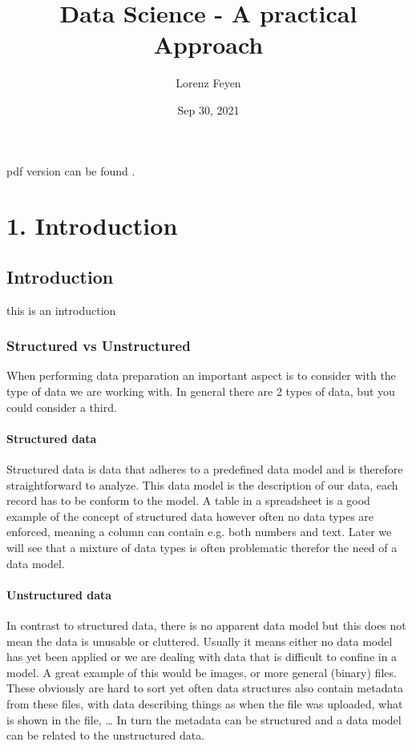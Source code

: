 \documentclass[letterpaper,10pt,english]{jupyterBook}
\title{Data Science - A practical Approach}
\date{Sep 30, 2021}
\author{Lorenz Feyen}
\begin{document}
\pagestyle{empty}
\sphinxmaketitle
\pagestyle{plain}
\sphinxtableofcontents
\pagestyle{normal}
\label{\detokenize{foreword::doc}}


\sphinxAtStartPar
pdf version can be found .


\part{1. Introduction}


\chapter{Introduction}
\label{\detokenize{c1_introduction/introduction:introduction}}\label{\detokenize{c1_introduction/introduction::doc}}
\sphinxAtStartPar
this is an introduction


\section{Structured vs Unstructured}
\label{\detokenize{c1_introduction/introduction:structured-vs-unstructured}}
\sphinxAtStartPar
When performing data preparation an important aspect is to consider with the type of data we are working with.
In general there are 2 types of data, but you could consider a third.


\subsection{Structured data}
\label{\detokenize{c1_introduction/introduction:structured-data}}
\sphinxAtStartPar
Structured data is data that adheres to a pre\sphinxhyphen{}defined data model and is therefore straightforward to analyze.
This data model is the description of our data, each record has to be conform to the model.
A table in a spreadsheet is a good example of the concept of structured data however often no data types are enforced, meaning a column can contain e.g. both numbers and text.
Later we will see that a mixture of data types is often problematic therefor the need of a data model.


\subsection{Unstructured data}
\label{\detokenize{c1_introduction/introduction:unstructured-data}}
\sphinxAtStartPar
In contrast to structured data, there is no apparent data model but this does not mean the data is unusable or cluttered.
Usually it means either no data model has yet been applied or we are dealing with data that is difficult to confine in a model.
A great example of this would be images, or more general (binary) files.
These obviously are hard to sort yet often data structures also contain metadata from these files, with data describing things as when the file was uploaded, what is shown in the file, …
In turn the metadata can be structured and a data model can be related to the unstructured data.
\end{document}
